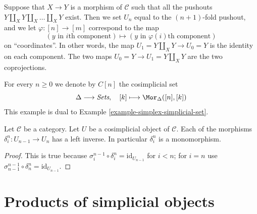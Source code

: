 \begin{example}
\label{example-push-outs-simplicial-object}
Suppose that $X\to Y$ is a morphism of $\mathcal{C}$ such that all
the pushouts $Y\amalg_X Y \amalg_X \ldots \amalg_X Y$ exist.
Then we set $U_n$ equal to the $(n + 1)$-fold pushout,
and we let $\varphi : [n] \to [m]$ correspond to the map
$$
(y \text{ in }i\text{th component})
\mapsto
(y \text{ in }\varphi(i)\text{th component})
$$
on ``coordinates''.
In other words, the map $U_1 = Y \amalg_X Y \to U_0 = Y$ is the
identity on each component.
The two maps $U_0 = Y \to U_1 = Y \amalg_X Y$ are the two coprojections.
\end{example}

\begin{example}
\label{example-simplex-cosimplicial-set}
For every $n \geq 0$ we denote by $C[n]$ the cosimplicial set
$$
\Delta \longrightarrow \textit{Sets},\quad
[k] \longmapsto \Mor_{\Delta}([n], [k])
$$
This example is dual to Example \ref{example-simplex-simplicial-set}.
\end{example}

\begin{lemma}
\label{lemma-di-injective}
Let $\mathcal{C}$ be a category.
Let $U$ be a cosimplicial object of $\mathcal{C}$.
Each of the morphisms $\delta^n_i : U_{n - 1} \to U_n$
has a left inverse. In particular $\delta^n_i$ is a monomorphism.
\end{lemma}

\begin{proof}
This is true because
$\sigma_i^{n - 1} \circ \delta^n_i = \text{id}_{U_{n - 1}}$
for $i < n$; for $i = n$ use $\sigma_{n - 1}^{n - 1} \circ \delta^n_n = \text{id}_{U_{n - 1}}$.
\end{proof}


























\section{Products of simplicial objects}
\label{section-products}

